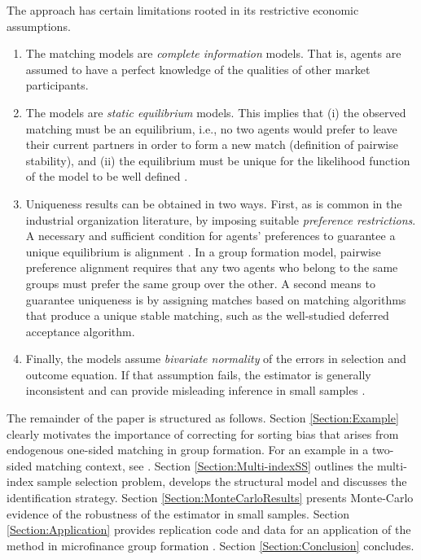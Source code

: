 \begin{itemize}
The approach has certain limitations rooted in its restrictive economic assumptions. 
\begin{enumerate}
\item The matching models are \textit{complete information} models. That is, agents are assumed to have a perfect knowledge of the qualities of other market participants.
\item The models are \textit{static equilibrium} models. This implies that (i) the observed matching must be an equilibrium, i.e., no two agents would prefer to leave their current partners in order to form a new match (definition of pairwise stability), and (ii) the equilibrium must be unique for the likelihood function of the model to be well defined \citep{Bresnahan1991}.
\item Uniqueness results can be obtained in two ways. First, as is common in the industrial organization literature, by imposing suitable \textit{preference restrictions}. A necessary and sufficient condition for agents' preferences to guarantee a unique equilibrium is alignment \citep{Pycia2010}. In a group formation model, pairwise preference alignment requires that any two agents who belong to the same groups must prefer the same group over the other. A second means to guarantee uniqueness is by assigning matches based on matching algorithms that produce a unique stable matching, such as the well-studied \citet{Gale1962} deferred acceptance algorithm.
\item Finally, the models assume \textit{bivariate normality} of the errors in selection and outcome equation. If that assumption fails, the estimator is generally inconsistent and can provide misleading inference in small samples \citep{Goldberger1983}.
\end{enumerate}
\end{itemize}

\noindent The remainder of the paper is structured as follows. Section \ref{Section:Example} clearly motivates the importance of correcting for sorting bias that arises from endogenous one-sided matching in group formation. For an example in a two-sided matching context, see \citet{Sorensen2007}. Section \ref{Section:Multi-indexSS} outlines the multi-index sample selection problem, develops the structural model and discusses the identification strategy. Section \ref{Section:MonteCarloResults} presents Monte-Carlo evidence of the robustness of the estimator in small samples. Section \ref{Section:Application} provides replication code and data for an application of the method in microfinance group formation \citep[see][]{Klein2015a}. Section \ref{Section:Conclusion} concludes.





